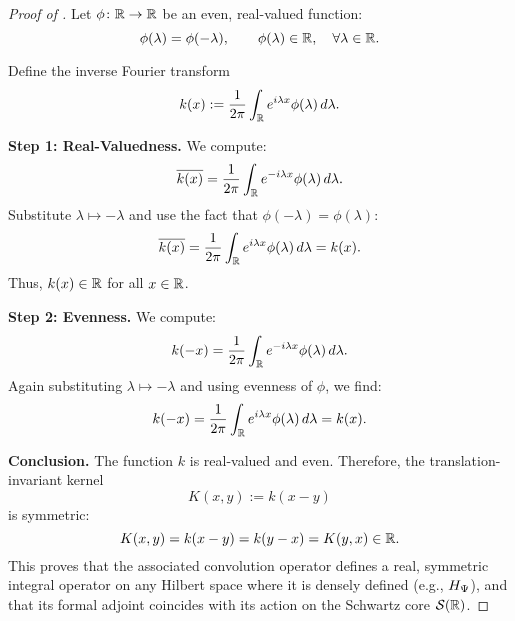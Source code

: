\begin{proof}[Proof of ]
Let \( \phi \colon \mathbb{R} \to \mathbb{R} \) be an even, real-valued function:
\[
\phi(\lambda) = \phi(-\lambda), \qquad \phi(\lambda) \in \mathbb{R}, \quad \forall \lambda \in \mathbb{R}.
\]

Define the inverse Fourier transform
\[
k(x) := \frac{1}{2\pi} \int_{\mathbb{R}} e^{i \lambda x} \phi(\lambda)\, d\lambda.
\]

\medskip
\noindent\textbf{Step 1: Real-Valuedness.}
We compute:
\[
\overline{k(x)} = \frac{1}{2\pi} \int_{\mathbb{R}} e^{-i \lambda x} \phi(\lambda)\, d\lambda.
\]
Substitute \( \lambda \mapsto -\lambda \) and use the fact that \( \phi(-\lambda) = \phi(\lambda) \):
\[
\overline{k(x)} = \frac{1}{2\pi} \int_{\mathbb{R}} e^{i \lambda x} \phi(\lambda)\, d\lambda = k(x).
\]
Thus, \( k(x) \in \mathbb{R} \) for all \( x \in \mathbb{R} \).

\medskip
\noindent\textbf{Step 2: Evenness.}
We compute:
\[
k(-x) = \frac{1}{2\pi} \int_{\mathbb{R}} e^{-i \lambda x} \phi(\lambda)\, d\lambda.
\]
Again substituting \( \lambda \mapsto -\lambda \) and using evenness of \( \phi \), we find:
\[
k(-x) = \frac{1}{2\pi} \int_{\mathbb{R}} e^{i \lambda x} \phi(\lambda)\, d\lambda = k(x).
\]

\medskip
\noindent\textbf{Conclusion.}
The function \( k \) is real-valued and even. Therefore, the translation-invariant kernel
\[
K(x,y) := k(x - y)
\]
is symmetric:
\[
K(x,y) = k(x - y) = k(y - x) = K(y,x) \in \mathbb{R}.
\]
This proves that the associated convolution operator defines a real, symmetric integral operator on any Hilbert space where it is densely defined (e.g., \( H_{\Psi} \)), and that its formal adjoint coincides with its action on the Schwartz core \( \mathcal{S}(\mathbb{R}) \).
\end{proof}
